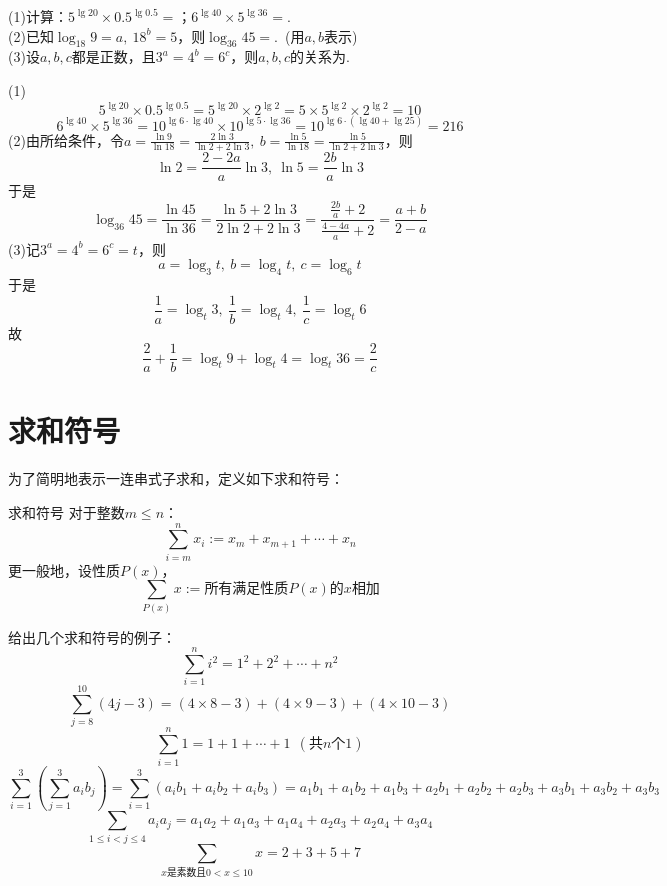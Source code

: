 \documentclass[lang=cn, zihao=5]{elegantbook}
\newcommand{\ssb}[1]{\left( #1 \right)}
\newcommand{\tk}{\uline{\hspace{4em}}}
\begin{document}
\begin{example}
	(1)计算：$5^{\lg 20} \times 0.5^{\lg 0.5}=$\tk ；$6^{\lg 40} \times 5^{\lg 36}=$\tk . \\
	(2)已知$\log_{18}{9}=a,~18^b=5$，则$\log_{36}{45}=$\tk .~(用$a,b$表示) \\
	(3)设$a,b,c$都是正数，且$3^a=4^b=6^c$，则$a,b,c$的关系为\tk .
\end{example}
\begin{solution}
	(1)$$5^{\lg 20} \times 0.5^{\lg 0.5} = 5^{\lg 20} \times 2^{\lg 2} = 5 \times 5^{\lg 2} \times 2^{\lg 2} = 10$$
	$$6^{\lg 40} \times 5^{\lg 36} = 10^{\lg 6 \cdot \lg 40} \times 10^{\lg 5 \cdot \lg 36} = 10^{\lg 6 \cdot (\lg 40 + \lg 25)} = 216$$
	(2)由所给条件，令$a=\frac{\ln{9}}{\ln{18}}=\frac{2\ln{3}}{\ln{2}+2\ln{3}} ,~b=\frac{\ln{5}}{\ln{18}}=\frac{\ln{5}}{\ln{2}+2\ln{3}}$，则$$\ln{2}=\frac{2-2a}{a}\ln{3},~\ln{5}=\frac{2b}{a}\ln{3}$$
	于是
	$$\log_{36}{45} = \frac{\ln{45}}{\ln{36}} = \frac{\ln{5} + 2\ln{3}}{2\ln{2}+2\ln{3}} = \frac{\frac{2b}{a}+2}{\frac{4-4a}{a}+2} = \frac{a+b}{2-a}$$
	(3)记$3^a=4^b=6^c=t$，则$$a=\log_{3}{t},~b=\log_{4}{t},~c=\log_{6}{t}$$
	于是$$\frac{1}{a}=\log_{t}{3},~\frac{1}{b}=\log_{t}{4},~\frac{1}{c}=\log_{t}{6}$$
	故$$\frac{2}{a} + \frac{1}{b} = \log_{t}{9} + \log_{t}{4} = \log_{t}{36} = \frac{2}{c}$$
\end{solution}

\newpage
\section{求和符号}

为了简明地表示一连串式子求和，定义如下求和符号：

\begin{definition}{求和符号}
	对于整数$m \leq n$：$$\sum_{i=m}^{n} x_i := x_m + x_{m+1} + \cdots + x_{n}$$
	更一般地，设性质$P(x)$，$$\sum_{P(x)} x := \textit{所有满足性质$P(x)$的$x$相加}$$
\end{definition}

给出几个求和符号的例子：
$$\sum_{i=1}^{n} i^2 = 1^2 + 2^2 + \cdots + n^2$$
$$\sum_{j=8}^{10} (4j-3) = (4 \times 8-3) + (4 \times 9 - 3) + (4 \times 10 -3)$$
$$\sum_{i=1}^{n} 1 = 1 + 1 + \cdots + 1~~(\textit{共$n$个$1$})$$
$$\sum_{i=1}^{3} \ssb{\sum_{j=1}^{3} a_ib_j} = \sum_{i=1}^{3} \ssb{a_ib_1+a_ib_2+a_ib_3} = a_1b_1+a_1b_2+a_1b_3+a_2b_1+a_2b_2+a_2b_3+a_3b_1+a_3b_2+a_3b_3$$
$$\sum_{1 \leq i < j \leq 4} a_ia_j = a_1a_2 + a_1a_3 + a_1a_4 + a_2a_3 + a_2a_4 + a_3a_4$$
$$\sum_{\textit{$x$是素数且$0< x \leq 10$}} x = 2+3+5+7$$
\end{document}
